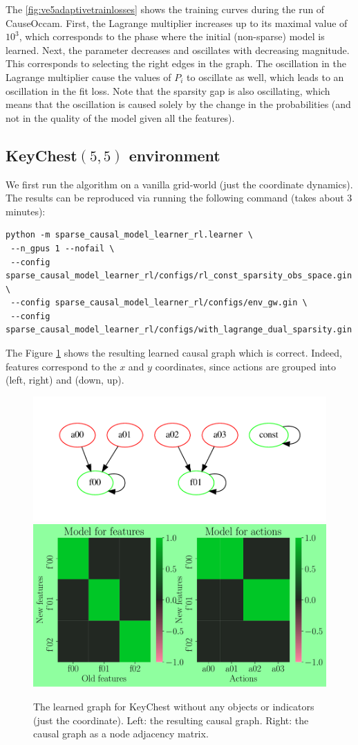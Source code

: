 \documentclass[a4paper,11pt,oneside]{report}
\newcommand{\sysname}{CauseOccam\xspace}
\begin{document}
The \autoref{fig:ve5adaptivetrainlosses} shows the training curves during the run of \sysname. First, the Lagrange multiplier increases up to its maximal value of $10^{3}$, which corresponds to the phase where the initial (non-sparse) model is learned. Next, the parameter decreases and oscillates with decreasing magnitude. This corresponds to selecting the right edges in the graph. The oscillation in the Lagrange multiplier cause the values of $P_i$ to oscillate as well, which leads to an oscillation in the fit loss. Note that the sparsity gap is also oscillating, which means that the oscillation is caused solely by the change in the probabilities (and not in the quality of the model given all the features).
\subsection{KeyChest$(5, 5)$ environment}
We first run the algorithm on a vanilla grid-world (just the coordinate dynamics). The results can be reproduced via running the following command (takes about 3 minutes):

\begin{verbatim}
python -m sparse_causal_model_learner_rl.learner \
 --n_gpus 1 --nofail \
 --config sparse_causal_model_learner_rl/configs/rl_const_sparsity_obs_space.gin \
 --config sparse_causal_model_learner_rl/configs/env_gw.gin \
 --config sparse_causal_model_learner_rl/configs/with_lagrange_dual_sparsity.gin
\end{verbatim}

The Figure \ref{fig:gw_adaptivelearnedgraph} shows the resulting learned causal graph which is correct. Indeed, features correspond to the $x$ and $y$ coordinates, since actions are grouped into (left, right) and (down, up).
\begin{figure}
    \centering
    \includegraphics[width=0.6\linewidth]{plots/gw_graph}
    \includegraphics[width=0.39\linewidth]{plots/gw_graph_edge}
    \caption{The learned graph for KeyChest without any objects or indicators (just the coordinate). Left: the resulting causal graph. Right: the causal graph as a node adjacency matrix.}
    \label{fig:gw_adaptivelearnedgraph}
\end{figure}
\end{document}
